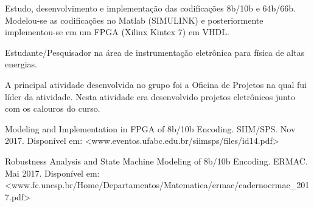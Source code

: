 \documentclass[10pt,a4paper,ragged2e]{altacv}
\begin{document}
Estudo, desenvolvimento e implementação das codificações 8b/10b e 64b/66b. Modelou-se as codificações no Matlab (SIMULINK) e posteriormente implementou-se em um FPGA (Xilinx Kintex 7) em VHDL. 

\divider

Estudante/Pesquisador na área de instrumentação eletrônica para física de altas energias. 

\divider

A principal atividade desenvolvida no grupo foi a Oficina de Projetos na qual fui líder da atividade. Nesta atividade era desenvolvido projetos eletrônicos junto com os calouros do curso. 


\medskip




\nocite{*}



\printbibliography[heading=pubtype,title={\printinfo{\faFileTextO}{Artigos}}, type=article]
\printinfo{\faFileTextO}{}Modeling and Implementation in FPGA of 8b/10b Encoding. SIIM/SPS. Nov 2017. Disponível em: <www.eventos.ufabc.edu.br/siimsps/files/id14.pdf>


\printinfo{\faFileTextO}{}Robustness Analysis and State Machine Modeling of 8b/10b Encoding. ERMAC. Mai 2017. Disponível em: <www.fc.unesp.br/Home/Departamentos/Matematica/ermac/caderno\-ermac\_2017.pdf>


\end{document}
